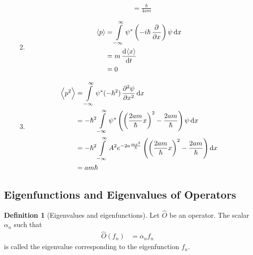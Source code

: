 \documentclass[titlepage, fleqn, a4paper, 12pt, twoside]{article}
\theoremstyle{definition}
\newtheorem{definition}{Definition}
\theoremstyle{theorem}
\begin{document}
\begin{solution}
\begin{enumerate}[leftmargin=*]
\begin{enumerate}[leftmargin=*]
\begin{align*}
{						}                                                                \\
                                                                                                                  & = \frac{\hbar}{4 a m}
					\end{align*}
				\item
					\begin{align*}
						\langle p \rangle & = \int\limits_{-\infty}^{\infty} \psi^* \left( -i \hbar \dpd{}{x} \right) \psi \dif x \\
                                                                  & = m \dod{\langle x \rangle}{t}                                                        \\
                                                                  & = 0
					\end{align*}
				\item
					\begin{align*}
						\left\langle p^2 \right\rangle & = \int\limits_{-\infty}^{\infty} \psi^* (-\hbar^2) \dpd[2]{\psi}{x} \dif x                                                                                    \\
                                                                               & = -\hbar^2 \int\limits_{-\infty}^{\infty} \psi^* \left( \left( \frac{2 a m}{\hbar} x \right)^2 - \frac{2 a m}{\hbar} \right) \psi \dif x                      \\
                                                                               & = -\hbar^2 \int\limits_{-\infty}^{\infty} A^2 e^{-2 a \frac{m x^2}{\hbar}} \left( \left( \frac{2 a m}{\hbar} x \right)^2 - \frac{2 a m}{\hbar} \right) \dif x \\
                                                                               & = a m \hbar
					\end{align*}
			\end{enumerate}
	\end{enumerate}
\end{solution}

\subsection{Eigenfunctions and Eigenvalues of Operators}

\begin{definition}[Eigenvalues and eigenfunctions]
	Let $\hat{O}$ be an operator.
	The scalar $\alpha_n$ such that
	\begin{align*}
		\hat{O}(f_n) &= \alpha_n f_n
	\end{align*}
	is called the eigenvalue corresponding to the eigenfunction $f_n$.
\end{definition}
\end{document}
